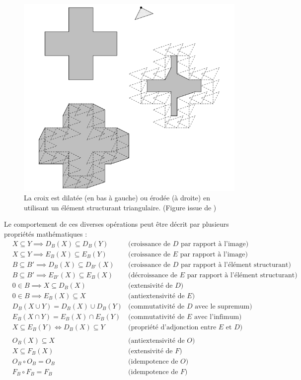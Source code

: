 \documentclass[11pt,a4paper]{report}
\newcommand{\1}{\mathbbm{1}}
\begin{document}
\begin{figure}
\begin{center}
\includegraphics[scale=0.5]{erodil.png}
\caption*{La croix est dilatée (en bas à gauche) ou érodée (à droite) en utilisant un élément structurant triangulaire. (Figure issue de \cite{Blo07})}
\end{center}
\end{figure}
Le comportement de ces diverses opérations peut être décrit par plusieurs propriétés mathématiques :
\begin{align*}
& X \subseteq Y \implies D_B(X) \subseteq D_B(Y) & \text{(croissance de $D$ par rapport à l'image)} \\
& X \subseteq Y \implies E_B(X) \subseteq E_B(Y) & \text{(croissance de $E$ par rapport à l'image)}\\
& B \subseteq B' \implies D_B(X) \subseteq D_{B'}(X) & \text{(croissance de $D$ par rapport à l'élément structurant)} \\
& B \subseteq B' \implies E_{B'}(X) \subseteq E_B(X) & \text{(décroissance de $E$ par rapport à l'élément structurant)} \\
& 0 \in B \implies X \subseteq D_B(X) & \text{(extensivité de $D$)} \\
& 0 \in B \implies E_B(X) \subseteq X & \text{(antiextensivité de $E$)} \\
& D_B(X \cup Y) = D_B(X) \cup D_B(Y) & \text{(commutativité de $D$ avec le supremum)} \\
& E_B(X \cap Y) = E_B(X) \cap E_B(Y) & \text{(commutativité de $E$ avec l'infimum)} \\
& X \subseteq E_B(Y) \Longleftrightarrow D_B(X) \subseteq Y & \text{(propriété d'adjonction entre $E$ et $D$)} \\
& & \\
& O_B(X) \subseteq X & \text{(antiextensivité de $O$)} \\
& X \subseteq F_B(X) & \text{(extensivité de $F$)} \\
& O_B \circ O_B = O_B & \text{(idempotence de $O$)} \\
& F_B \circ F_B = F_B & \text{(idempotence de $F$)} 
\end{align*}
\end{document}
